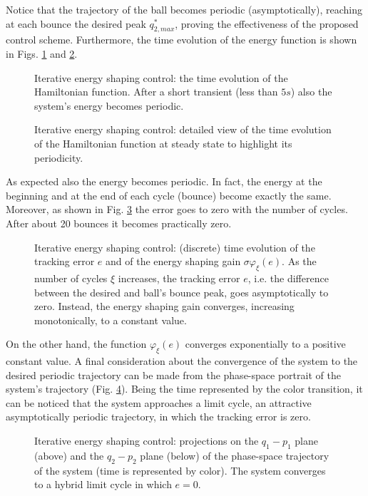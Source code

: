 %
%
Notice that the trajectory of the ball becomes periodic (asymptotically), reaching at each bounce the desired peak $q_{2,max}^*$, proving the effectiveness of the proposed control scheme. Furthermore, the time evolution of the energy function is shown in Figs. \ref{fig:cH} and \ref{fig:cH_d}. 
%
\begin{figure}[h]
	\centering
	\caption{Iterative energy shaping control: the time evolution of the Hamiltonian function. After a short transient (less than $5s$) also the system's energy becomes periodic.}
	\label{fig:cH}
\end{figure}
%
\begin{figure}[h]
	\centering
	\caption{Iterative energy shaping control: detailed view of the time evolution of the Hamiltonian function at steady state to highlight its periodicity.}
	\label{fig:cH_d}
\end{figure}
%
As expected also the energy becomes periodic. In fact, the energy at the beginning and at the end of each cycle (bounce) become exactly the same. Moreover, as shown in Fig. \ref{fig:e} the error goes to zero with the number of cycles. After about 20 bounces it becomes practically zero.
%
\begin{figure}[h]
	\centering
	\caption{Iterative energy shaping control: (discrete) time evolution of the tracking error $e$ and of the energy shaping gain $\sigma\varphi_\xi(e)$. As the number of cycles $\xi$ increases, the tracking error $e$, i.e. the difference between the desired and ball's bounce peak, goes asymptotically to zero. Instead, the energy shaping gain converges, increasing monotonically, to a constant value.}
	\label{fig:e}
\end{figure}
%
On the other hand, the function $\varphi_\xi(e)$ converges exponentially to a positive constant value. 
%
A final consideration about the convergence of the system to the desired periodic trajectory can be made from the phase-space portrait of the system's trajectory (Fig. \ref{fig:phb}). Being the time represented by the color transition, it can be noticed that the system approaches a limit cycle, an attractive asymptotically periodic trajectory, in which the tracking error is zero.%
%
%
\begin{figure}[h]
	\centering
	\caption{Iterative energy shaping control: projections on the $q_1-p_1$ plane (above) and the $q_2-p_2$ plane (below) of the phase-space trajectory of the system (time is represented by color). The system converges to a hybrid limit cycle in which $e=0$.}
	\vspace{5mm}
	\label{fig:phb}
\end{figure}
%

